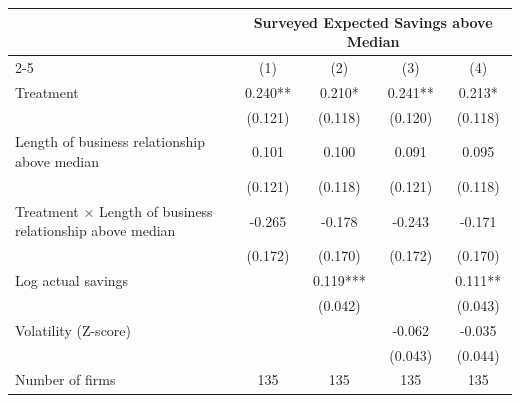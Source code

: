 \begin{tabular}[t]{lcccc}
\toprule
  & \multicolumn{4}{c}{Surveyed Expected Savings above Median} \\
  \cmidrule(lr){2-5} 
  & (1) & (2) & (3) & (4) \\
\midrule
Treatment & 0.240** & 0.210* & 0.241** & 0.213*\\
 & (0.121) & (0.118) & (0.120) & (0.118)\\
Length of business relationship above median & 0.101 & 0.100 & 0.091 & 0.095\\
 & (0.121) & (0.118) & (0.121) & (0.118)\\
Treatment × Length of business relationship above median & -0.265 & -0.178 & -0.243 & -0.171\\
 & (0.172) & (0.170) & (0.172) & (0.170)\\
Log actual savings &  & 0.119*** &  & 0.111**\\
 &  & (0.042) &  & (0.043)\\
Volatility (Z-score) &  &  & -0.062 & -0.035\\
 &  &  & (0.043) & (0.044)\\
\midrule
Number of firms & 135 & 135 & 135 & 135\\
\bottomrule
\end{tabular}
